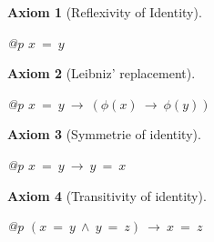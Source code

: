 \documentclass[a4paper,german,10pt,twoside]{book}
\newtheorem{ax}{Axiom}
\theoremstyle{definition}
\theoremstyle{remark}
\begin{document}
\par


\begin{ax}[Reflexivity of Identity]
\label{axiom:identityIsReflexive} \hypertarget{axiom:identityIsReflexive}{}
\mbox{}
\begin{longtable}{{@{\extracolsep{\fill}}p{\linewidth}}}
\centering $x \ =  \ y$
\end{longtable}

\end{ax}




\par


\begin{ax}[Leibniz' replacement]
\label{axiom:leibnizReplacement} \hypertarget{axiom:leibnizReplacement}{}
\mbox{}
\begin{longtable}{{@{\extracolsep{\fill}}p{\linewidth}}}
\centering $x \ =  \ y\ \rightarrow \ (\phi(x)\ \rightarrow \ \phi(y))$
\end{longtable}

\end{ax}




\par


\begin{ax}[Symmetrie of identity]
\label{axiom:symmetryOfIdentity} \hypertarget{axiom:symmetryOfIdentity}{}
\mbox{}
\begin{longtable}{{@{\extracolsep{\fill}}p{\linewidth}}}
\centering $x \ =  \ y\ \rightarrow \ y \ =  \ x$
\end{longtable}

\end{ax}




\par


\begin{ax}[Transitivity of identity]
\label{axiom:transitivityOfIdentity} \hypertarget{axiom:transitivityOfIdentity}{}
\mbox{}
\begin{longtable}{{@{\extracolsep{\fill}}p{\linewidth}}}
\centering $(x \ =  \ y\ \land \ y \ =  \ z)\ \rightarrow \ x \ =  \ z$
\end{longtable}

\end{ax}
\end{document}
